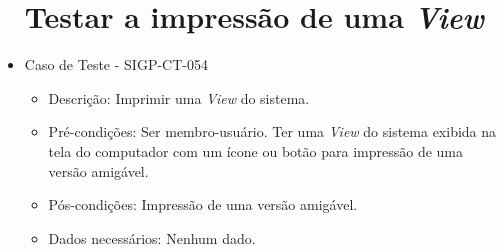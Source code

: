 \documentclass[11pt, a4paper]{book}
\begin{document}
\begin{itemize}
\newpage
\section{Testar a impressão de uma \emph{View}}
	\item Caso de Teste - SIGP-CT-054
	\begin{itemize}
	\item Descrição: Imprimir uma \emph{View} do sistema.
	\item Pré-condições: Ser membro-usuário. Ter uma \emph{View} do sistema exibida na tela do computador com um ícone ou botão para impressão de uma versão amigável.
	\item Pós-condições: Impressão de uma versão amigável.
	\item Dados necessários: Nenhum dado.
	\end{itemize}





\end{itemize}
\end{document}
